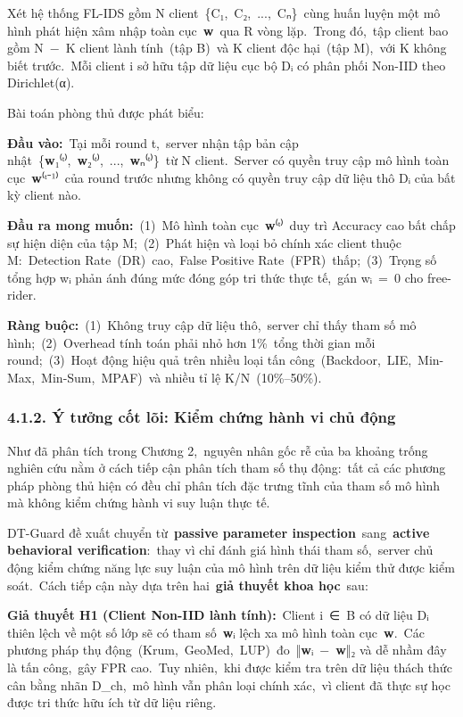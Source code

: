 Xét hệ thống FL-IDS gồm N client~\{C₁,~C₂,~...,~Cₙ\}~cùng huấn luyện một mô hình phát hiện xâm nhập toàn cục~\textbf{w}~qua R vòng lặp.~Trong đó,~tập client bao gồm N~−~K client lành tính~(tập B)~và K client độc hại~(tập M),~với K không biết trước.~Mỗi client i sở hữu tập dữ liệu cục bộ Dᵢ có phân phối Non-IID theo Dirichlet(α).

Bài toán phòng thủ được phát biểu:

\textbf{Đầu vào:}~Tại mỗi round t,~server nhận tập bản cập nhật~\{\textbf{w}₁⁽ᵗ⁾,~\textbf{w}₂⁽ᵗ⁾,~...,~\textbf{w}ₙ⁽ᵗ⁾\}~từ N client.~Server có quyền truy cập mô hình toàn cục~\textbf{w}⁽ᵗ⁻¹⁾~của round trước nhưng không có quyền truy cập dữ liệu thô Dᵢ của bất kỳ client nào.

\textbf{Đầu ra mong muốn:}~(1)~Mô hình toàn cục~\textbf{w}⁽ᵗ⁾~duy trì Accuracy cao bất chấp sự hiện diện của tập M;~(2)~Phát hiện và loại bỏ chính xác client thuộc M:~Detection Rate~(DR)~cao,~False Positive Rate~(FPR)~thấp;~(3)~Trọng số tổng hợp wᵢ phản ánh đúng mức đóng góp tri thức thực tế,~gán wᵢ~=~0 cho free-rider.

\textbf{Ràng buộc:}~(1)~Không truy cập dữ liệu thô,~server chỉ thấy tham số mô hình;~(2)~Overhead tính toán phải nhỏ hơn 1\%~tổng thời gian mỗi round;~(3)~Hoạt động hiệu quả trên nhiều loại tấn công~(Backdoor,~LIE,~Min-Max,~Min-Sum,~MPAF)~và nhiều tỉ lệ K/N~(10\%--50\%).

\subsubsection{4.1.2. Ý tưởng cốt lõi: Kiểm chứng hành vi chủ động}\label{uxfd-tux1b0ux1edfng-cux1ed1t-luxf5i-kiux1ec3m-chux1ee9ng-huxe0nh-vi-chux1ee7-ux111ux1ed9ng}

Như đã phân tích trong Chương 2,~nguyên nhân gốc rễ của ba khoảng trống nghiên cứu nằm ở cách tiếp cận phân tích tham số thụ động:~tất cả các phương pháp phòng thủ hiện có đều chỉ phân tích đặc trưng tĩnh của tham số mô hình mà không kiểm chứng hành vi suy luận thực tế.

DT-Guard đề xuất chuyển từ~\textbf{passive parameter inspection}~sang~\textbf{active behavioral verification}:~thay vì chỉ đánh giá hình thái tham số,~server chủ động kiểm chứng năng lực suy luận của mô hình trên dữ liệu kiểm thử được kiểm soát.~Cách tiếp cận này dựa trên hai~\textbf{giả thuyết khoa học}~sau:

\textbf{Giả thuyết H1 (Client Non-IID lành tính):}~Client i~∈~B có dữ liệu Dᵢ thiên lệch về một số lớp sẽ có tham số~\textbf{w}ᵢ lệch xa mô hình toàn cục~\textbf{w}.~Các phương pháp thụ động~(Krum,~GeoMed,~LUP)~đo~‖\textbf{w}ᵢ~−~\textbf{w}‖₂ và dễ nhầm đây là tấn công,~gây FPR cao.~Tuy nhiên,~khi được kiểm tra trên dữ liệu thách thức cân bằng nhãn D\_ch,~mô hình vẫn phân loại chính xác,~vì client đã thực sự học được tri thức hữu ích từ dữ liệu riêng.

